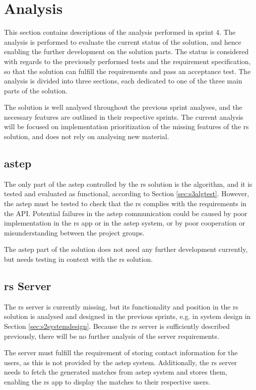 \section{Analysis}
This section contains descriptions of the analysis performed in sprint 4.
The analysis is performed to evaluate the current status of the solution, and hence enabling the further development on the solution parts.
The status is considered with regards to the previously performed tests and the requirement specification, so that the solution can fulfill the requirements and pass an acceptance test.
The analysis is divided into three sections, each dedicated to one of the three main parts of the solution.

The solution is well analysed throughout the previous sprint analyses, and the necessary features are outlined in their respective sprints.
The current analysis will be focused on implementation prioritization of the missing features of the \gls{rs} solution, and does not rely on analysing new material.


\subsection{\gls{astep}}
The only part of the \gls{astep} controlled by the \gls{rs} solution is the algorithm, and it is tested and evaluated as functional, according to Section \ref{sec:s3algtest}. However, the \gls{astep} must be tested to check that the \gls{rs} complies with the requirements in the API.
Potential failures in the \gls{astep} communication could be caused by poor implementation in the \gls{rs} app or in the \gls{astep} system, or by poor cooperation or misunderstanding between the project groups.

The \gls{astep} part of the solution does not need any further development currently, but needs testing in context with the \gls{rs} solution.

\subsection{\gls{rs} Server}
The \gls{rs} server is currently missing, but its functionality and position in the \gls{rs} solution is analysed and designed in the previous sprints, e.g. in system design in Section \ref{sec:s2systemdesign}. Because the \gls{rs} server is sufficiently described previously, there will be no further analysis of the server requirements.

The server must fulfill the requirement of storing contact information for the users, as this is not provided by the \gls{astep} system.
Additionally, the \gls{rs} server needs to fetch the generated matches from \gls{astep} system and stores them, enabling the \gls{rs} app to display the matches to their respective users.


